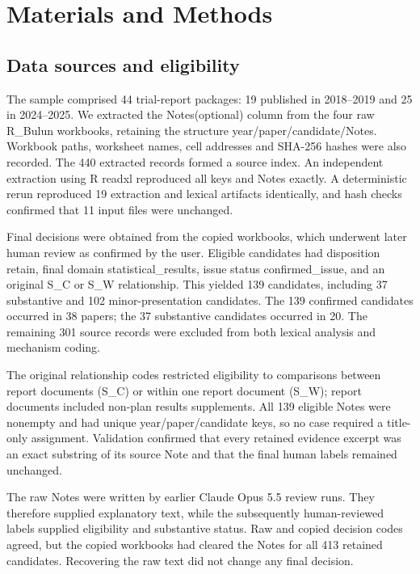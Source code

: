 \documentclass[11pt,a4paper]{article}
\begin{document}
\section{Materials and Methods}
\subsection{Data sources and eligibility}
The sample comprised 44 trial-report packages: 19 published in 2018–2019 and 25 in 2024–2025. We extracted the Notes(optional) column from the four raw R\_\allowbreak{}Bulun workbooks, retaining the structure year/paper/candidate/Notes. Workbook paths, worksheet names, cell addresses and SHA-256 hashes were also recorded. The 440 extracted records formed a source index. An independent extraction using R readxl reproduced all keys and Notes exactly. A deterministic rerun reproduced 19 extraction and lexical artifacts identically, and hash checks confirmed that 11 input files were unchanged.\par
Final decisions were obtained from the copied workbooks, which underwent later human review as confirmed by the user. Eligible candidates had disposition retain, final domain statistical\_\allowbreak{}results, issue status confirmed\_\allowbreak{}issue, and an original S\_\allowbreak{}C or S\_\allowbreak{}W relationship. This yielded 139 candidates, including 37 substantive and 102 minor-presentation candidates. The 139 confirmed candidates occurred in 38 papers; the 37 substantive candidates occurred in 20. The remaining 301 source records were excluded from both lexical analysis and mechanism coding.\par
The original relationship codes restricted eligibility to comparisons between report documents (S\_\allowbreak{}C) or within one report document (S\_\allowbreak{}W); report documents included non-plan results supplements. All 139 eligible Notes were nonempty and had unique year/paper/candidate keys, so no case required a title-only assignment. Validation confirmed that every retained evidence excerpt was an exact substring of its source Note and that the final human labels remained unchanged.\par
The raw Notes were written by earlier Claude Opus 5.5 review runs. They therefore supplied explanatory text, while the subsequently human-reviewed labels supplied eligibility and substantive status. Raw and copied decision codes agreed, but the copied workbooks had cleared the Notes for all 413 retained candidates. Recovering the raw text did not change any final decision.\par
\end{document}
